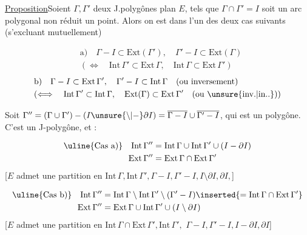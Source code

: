 \uline{Proposition}\qquad Soient $\Gamma,\Gamma'$ deux J.polygônes  plan $E$, tels que $\Gamma\cap\Gamma'=I$ soit un arc polygonal non réduit  un point. Alors on est dans l'un des deux cas suivants (s'excluant mutuellement)

\[
\begin{aligned}
 &\mathrm{a)}\quad \Gamma-I\subset\mathrm{Ext}(\Gamma'),\quad
 \Gamma'-I\subset\mathrm{Ext}(\Gamma)\\
 &(\Longleftrightarrow\quad \mathrm{Int}\,\Gamma'\subset\mathrm{Ext}\,\Gamma,\quad
 \mathrm{Int}\,\Gamma\subset\mathrm{Ext}\,\Gamma')
\end{aligned}
\]
\[
\begin{aligned}
 &\mathrm{b)}\quad\Gamma-I\subset\mathrm{Ext}\,\Gamma',\quad
 \Gamma'-I\subset\mathrm{Int}\,\Gamma\quad \text{(ou inversement)}\\
 &(\Longleftrightarrow\quad \mathrm{Int}\,\Gamma'\subset\mathrm{Int}\,\Gamma,\quad
 \mathrm{Ext}(\Gamma)\subset\mathrm{Ext}\,\Gamma'\quad \text{(ou \unsure{inv.|in..})})
\end{aligned}
\]

Soit $\Gamma''=(\Gamma\cup\Gamma')-(I\unsure{\setminus|-}\partial I)
=\overline{\Gamma-I}\cup\overline{\Gamma'-I}$, qui est un polygône.
C'est un J-polygône, et  :

\[
\begin{aligned}
 \text{\uline{Cas a)}}\quad \mathrm{Int}\,\Gamma''&=\mathrm{Int}\,\Gamma\cup\mathrm{Int}\,\Gamma'\cup(I-\partial I)\\
 \mathrm{Ext}\,\Gamma''&=\mathrm{Ext}\,\Gamma\cap\mathrm{Ext}\,\Gamma'
\end{aligned}
\]
[$E$ admet une partition en  $\mathrm{Int}\,\Gamma,\mathrm{Int}\,\Gamma',\Gamma-I,\Gamma'-I,I\setminus\partial I,\partial I,$]

\[
\begin{aligned}
 \text{\uline{Cas b)}}\quad \mathrm{Int}\,\Gamma''&=
 \mathrm{Int}\,\Gamma\setminus\mathrm{Int}\,\Gamma'\setminus(\Gamma'-I)\inserted{=\mathrm{Int}\,\Gamma\cap\mathrm{Ext}\,\Gamma'}\\
 \mathrm{Ext}\,\Gamma''&=\mathrm{Ext}\,\Gamma\cup\mathrm{Int}\,\Gamma'\cup(I\setminus\partial I)
\end{aligned}
\]
[$E$ admet une partition en 
$\mathrm{Int}\,\Gamma\cap\mathrm{Ext}\,\Gamma',\mathrm{Int}\,\Gamma',$
$\Gamma-I,\Gamma'-I,I-\partial I,\partial I$]
